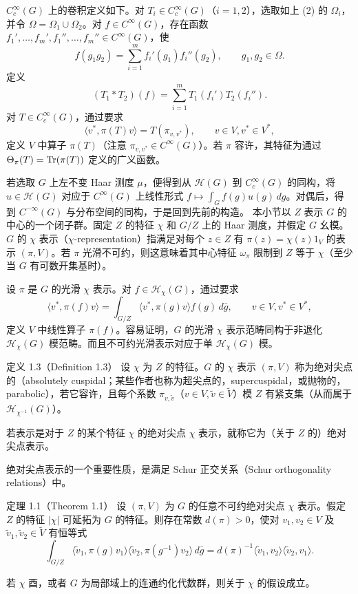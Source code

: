 $C_c^\infty(G)$ 上的卷积定义如下。对 $T_i\in C_c^\infty(G)$（$i=1,2$），选取如上 (2) 的 $\Omega_i$，并令 $\Omega=\Omega_1\cup\Omega_2$。对 $f\in C^\infty(G)$，存在函数 $f_1',\ldots,f_m',f_1'',\ldots,f_m''\in C^\infty(G)$，使
\[
f(g_1g_2)=\sum_{i=1}^m f_i'(g_1)f_i''(g_2),\qquad g_1,g_2\in\Omega.\tag{17}
\]
定义
\[
(T_1*T_2)(f)=\sum_{i=1}^mT_1(f_i')T_2(f_i'').\tag{18}
\]
对 $T\in C_c^\infty(G)$，通过要求
\[
\langle v^*,\pi(T)v\rangle=T(\pi_{v,v^*}),\qquad v\in V,v^*\in V^*,\tag{19}
\]
定义 $V$ 中算子 $\pi(T)$（注意 $\pi_{v,v^*}\in C^\infty(G)$）。若 $\pi$ 容许，其特征为通过 $\Theta_\pi(T)=\operatorname{Tr}(\pi(T))$ 定义的广义函数。

若选取 $G$ 上左不变 Haar 测度 $\mu$，便得到从 $\mathcal H(G)$ 到 $C_c^\infty(G)$ 的同构，将 $u\in\mathcal H(G)$ 对应于 $C^\infty(G)$ 上线性形式 $f\mapsto\int_G f(g)u(g)\,dg$。对偶后，得到 $C^{-\infty}(G)$ 与分布空间的同构，于是回到先前的构造。
本小节以 $Z$ 表示 $G$ 的中心的一个闭子群。固定 $Z$ 的特征 $\chi$ 和 $G/Z$ 上的 Haar 测度，并假定 $G$ 幺模。$G$ 的 $\chi$ 表示（$\chi$-representation）指满足对每个 $z\in Z$ 有 $\pi(z)=\chi(z)1_V$ 的表示 $(\pi,V)$。若 $\pi$ 光滑不可约，则这意味着其中心特征 $\omega_\pi$ 限制到 $Z$ 等于 $\chi$（至少当 $G$ 有可数开集基时）。

设 $\pi$ 是 $G$ 的光滑 $\chi$ 表示。对 $f\in\mathcal H_\chi(G)$，通过要求
\[
\langle v^*,\pi(f)v\rangle=\int_{G/Z}\langle v^*,\pi(g)v\rangle f(g)\,d\bar g,\qquad v\in V,v^*\in V^*,\tag{20}
\]
定义 $V$ 中线性算子 $\pi(f)$。容易证明，$G$ 的光滑 $\chi$ 表示范畴同构于非退化 $\mathcal H_\chi(G)$ 模范畴。而且不可约光滑表示对应于单 $\mathcal H_\chi(G)$ 模。
\begin{originaltheorem}{定义 1.3（Definition 1.3）}
设 $\chi$ 为 $Z$ 的特征。$G$ 的 $\chi$ 表示 $(\pi,V)$ 称为绝对尖点的（absolutely cuspidal；某些作者也称为超尖点的，supercuspidal，或抛物的，parabolic），若它容许，且每个系数 $\pi_{v,\widetilde v}$（$v\in V,\widetilde v\in\widetilde V$）模 $Z$ 有紧支集（从而属于 $\mathcal H_{\chi^{-1}}(G)$）。
\end{originaltheorem}
若表示是对于 $Z$ 的某个特征 $\chi$ 的绝对尖点 $\chi$ 表示，就称它为（关于 $Z$ 的）绝对尖点表示。

绝对尖点表示的一个重要性质，是满足 Schur 正交关系（Schur orthogonality relations）中。
\begin{originaltheorem}{定理 1.1（Theorem 1.1）}
设 $(\pi,V)$ 为 $G$ 的任意不可约绝对尖点 $\chi$ 表示。假定 $Z$ 的特征 $|\chi|$ 可延拓为 $G$ 的特征。则存在常数 $d(\pi)>0$，使对 $v_1,v_2\in V$ 及 $\widetilde v_1,\widetilde v_2\in\widetilde V$ 有恒等式
\[
\int_{G/Z}\langle\widetilde v_1,\pi(g)v_1\rangle\langle\widetilde v_2,\pi(g^{-1})v_2\rangle\,d\bar g
=d(\pi)^{-1}\langle\widetilde v_1,v_2\rangle\langle\widetilde v_2,v_1\rangle.\tag{21}
\]
\end{originaltheorem}
若 $\chi$ 酉，或者 $G$ 为局部域上的连通约化代数群，则关于 $\chi$ 的假设成立。

